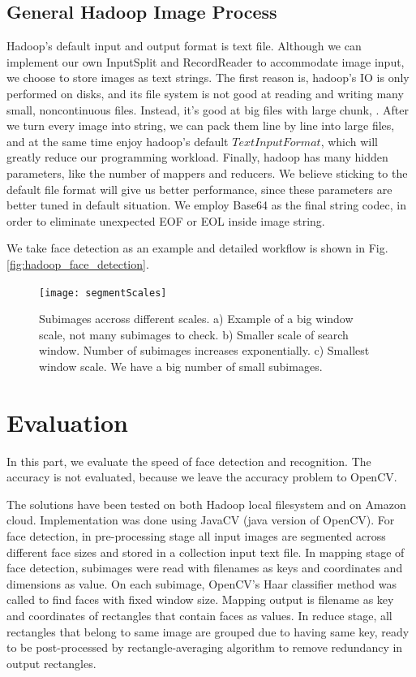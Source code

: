 \documentclass[11pt, draftclsnofoot, onecolumn]{IEEEtran}
\begin{document}
\subsection {General Hadoop Image Process}

Hadoop's default input and output format is text file. Although we can implement our own InputSplit and RecordReader to accommodate image input, we choose to store images as text strings. The first reason is, hadoop's IO is only performed on disks, and its file system is not good at reading and writing many small, noncontinuous files. Instead, it's good at big files with large chunk, \cite{sweeney2011hipi}. After we turn every image into string, we can pack them line by line into large files, and at the same time enjoy hadoop's default $TextInputFormat$, which will greatly reduce our programming workload. Finally, hadoop has many hidden parameters, like the number of mappers and reducers. We believe sticking to the default file format will give us better performance, since these parameters are better tuned in default situation. We employ Base64 as the final string codec, in order to eliminate unexpected EOF or EOL inside image string.

We take face detection as an example and detailed workflow is shown in Fig. \ref{fig:hadoop_face_detection}.

\begin{figure}[t!]
\centering
\texttt{[image: segmentScales]}
\caption{Subimages accross different scales. a) Example of a big window scale, not many subimages to check. b) Smaller scale of search window. Number of subimages increases exponentially. c) Smallest window scale. We have a big number of small subimages. }
\end{figure}

\section{Evaluation} \label{sec:evaluation}

In this part, we evaluate the speed of face detection and recognition. The accuracy is not evaluated, because we leave the accuracy problem to OpenCV.

The solutions have been tested on both Hadoop local filesystem and on Amazon cloud. Implementation was done using JavaCV (java version of OpenCV). For face detection, in pre-processing stage all input images are segmented across different face sizes and stored in a collection input text file. In mapping stage of face detection, subimages were read with filenames as keys and coordinates and dimensions as value. On each subimage, OpenCV's Haar classifier method was called to find faces with fixed window size. Mapping output is filename as key and coordinates of rectangles that contain faces as values. In reduce stage, all rectangles that belong to same image are grouped due to having same key, ready to be post-processed by rectangle-averaging algorithm to remove redundancy in output rectangles.
\end{document}
